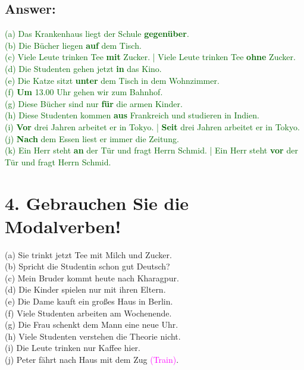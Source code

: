 \documentclass[a4paper,12pt]{article}
\begin{document}
\subsection*{Answer:}
\textcolor{darkgreen}{(a) Das Krankenhaus liegt der Schule \textbf{gegenüber}.}\\
\textcolor{darkgreen}{(b) Die Bücher liegen \textbf{auf} dem Tisch.}\\
\textcolor{darkgreen}{(c) Viele Leute trinken Tee \textbf{mit} Zucker. | Viele Leute trinken Tee \textbf{ohne} Zucker.}\\
\textcolor{darkgreen}{(d) Die Studenten gehen jetzt \textbf{in} das Kino.}\\
\textcolor{darkgreen}{(e) Die Katze sitzt \textbf{unter} dem Tisch in dem Wohnzimmer.}\\
\textcolor{darkgreen}{(f) \textbf{Um} 13.00 Uhr gehen wir zum Bahnhof.}\\
\textcolor{darkgreen}{(g) Diese Bücher sind nur \textbf{für} die armen Kinder.}\\
\textcolor{darkgreen}{(h) Diese Studenten kommen \textbf{aus} Frankreich und studieren in Indien.}\\
\textcolor{darkgreen}{(i) \textbf{Vor} drei Jahren arbeitet er in Tokyo. | \textbf{Seit} drei Jahren arbeitet er in Tokyo.}\\
\textcolor{darkgreen}{(j) \textbf{Nach} dem Essen liest er immer die Zeitung.}\\
\textcolor{darkgreen}{(k) Ein Herr steht \textbf{an} der Tür und fragt Herrn Schmid. | Ein Herr steht \textbf{vor} der Tür und fragt Herrn Schmid.}\\

\vspace{1cm}

\section*{4. Gebrauchen Sie die Modalverben!}

(a) Sie trinkt jetzt Tee mit Milch und Zucker.\\
(b) Spricht die Studentin schon gut Deutsch?\\
(c) Mein Bruder kommt heute nach Kharagpur.\\
(d) Die Kinder spielen nur mit ihren Eltern.\\
(e) Die Dame kauft ein großes Haus in Berlin.\\
(f) Viele Studenten arbeiten am Wochenende.\\
(g) Die Frau schenkt dem Mann eine neue Uhr.\\
(h) Viele Studenten verstehen die Theorie nicht.\\
(i) Die Leute trinken nur Kaffee hier.\\
(j) Peter fährt nach Haus mit dem Zug \textcolor{magenta}{(Train)}.
\end{document}
